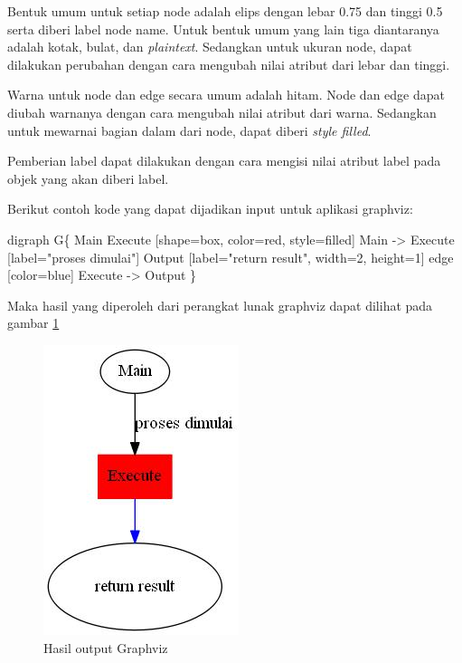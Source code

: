 Bentuk umum untuk setiap node adalah elips dengan lebar 0.75 dan tinggi 0.5 serta diberi label node name. Untuk bentuk umum yang lain tiga diantaranya adalah kotak, bulat, dan \textsl{plaintext}. Sedangkan untuk ukuran node, dapat dilakukan perubahan dengan cara mengubah nilai atribut dari lebar dan tinggi.

Warna untuk node dan edge secara umum adalah hitam. Node dan edge dapat diubah warnanya dengan cara mengubah nilai atribut dari warna. Sedangkan untuk mewarnai bagian dalam dari node, dapat diberi \textsl{style filled}.

Pemberian label dapat dilakukan dengan cara mengisi nilai atribut label pada objek yang akan diberi label.

Berikut contoh kode yang dapat dijadikan input untuk aplikasi graphviz:

\begin{algorithmic}[1]
	\STATE digraph G\{
	\STATE 		Main
	\STATE		Execute [shape=box, color=red, style=filled]
	\STATE		Main -> Execute [label="proses dimulai"]
	\STATE		Output [label="return result", width=2, height=1]
	\STATE    edge [color=blue]
	\STATE		Execute -> Output
	\STATE \}
\end{algorithmic}

Maka hasil yang diperoleh dari perangkat lunak graphviz dapat dilihat pada gambar \ref{fig:outGraphviz}

\begin{figure}[H]
\centering
\includegraphics[scale=0.9]{Gambar/Graphviz.jpg}
\caption[Hasil output Graphviz]{Hasil output Graphviz} 
\label{fig:outGraphviz}
\end{figure}












